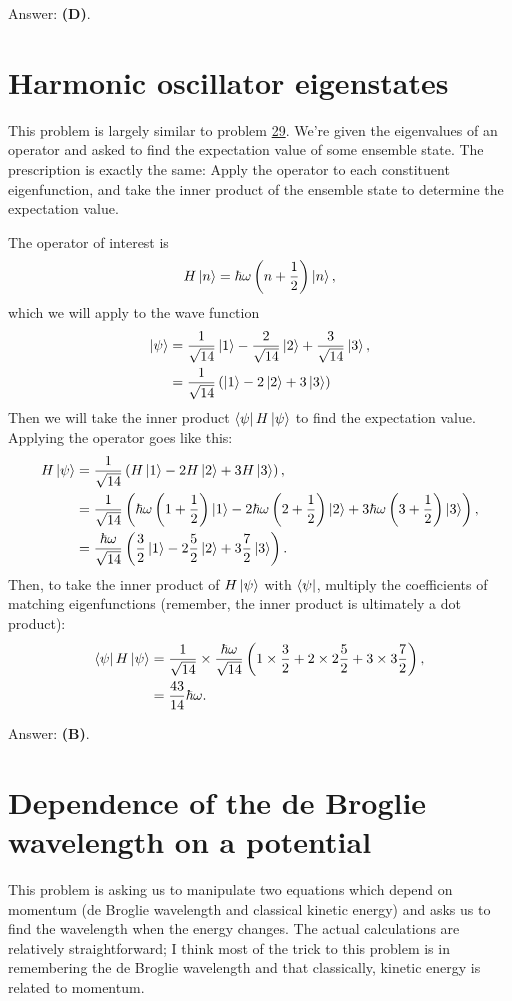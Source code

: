 \documentclass[11pt]{paper}
\newcommand{\answer}[1]{Answer: \textbf{(#1)}.}
\begin{document}
\answer{D}

\section{Harmonic oscillator eigenstates}
This problem is largely similar to problem \hyperlink{section.29}{29}.  We're given the eigenvalues of an operator and asked to find the expectation value of some ensemble state.  The prescription is exactly the same:  Apply the operator to each constituent eigenfunction, and take the inner product of the ensemble state to determine the expectation value.

The operator of interest is
\begin{equation}
H\ket{n} = \hbar \omega \left(n+\frac{1}{2}\right)\ket{n},
\end{equation}
which we will apply to the wave function
\begin{align}
\ket{\psi} &= \frac{1}{\sqrt{14}}\ket{1} - \frac{2}{\sqrt{14}}\ket{2} + \frac{3}{\sqrt{14}}\ket{3},\\
&= \frac{1}{\sqrt{14}}\left(\ket{1} - 2\ket{2} + 3\ket{3}\right)
\end{align}
Then we will take the inner product $\bra{\psi}H\ket{\psi}$ to find the expectation value.  Applying the operator goes like this:
\begin{align}
H\ket{\psi} &=  \frac{1}{\sqrt{14}}\left(H\ket{1} - 2H\ket{2} + 3H\ket{3}\right),\\
&=  \frac{1}{\sqrt{14}}\left(\hbar \omega \left(1+\frac{1}{2}\right)\ket{1} - 2\hbar \omega \left(2+\frac{1}{2}\right)\ket{2} + 3\hbar \omega \left(3+\frac{1}{2}\right)\ket{3}\right),\\
&= \frac{\hbar \omega}{\sqrt{14}}\left( \frac{3}{2}\ket{1} - 2 \frac{5}{2}\ket{2} + 3 \frac{7}{2}\ket{3}\right).
\end{align}
Then, to take the inner product of $H\ket{\psi}$ with $\bra{\psi}$, multiply the coefficients of matching eigenfunctions (remember, the inner product is ultimately a dot product):
\begin{align}
\bra{\psi}H\ket{\psi} &= \frac{1}{\sqrt{14}} \times \frac{\hbar\omega}{\sqrt{14}}\left(1\times\frac{3}{2} + 2\times2 \frac{5}{2}+3\times 3 \frac{7}{2}\right),\\
&= \frac{43}{14}\hbar\omega.
\end{align}

\answer{B}

\section{Dependence of the de Broglie wavelength on a potential}
This problem is asking us to manipulate two equations which depend on momentum (de Broglie wavelength and classical kinetic energy) and asks us to find the wavelength when the energy changes.  The actual calculations are relatively straightforward; I think most of the trick to this problem is in remembering the de Broglie wavelength and that classically, kinetic energy is related to momentum.
\end{document}
